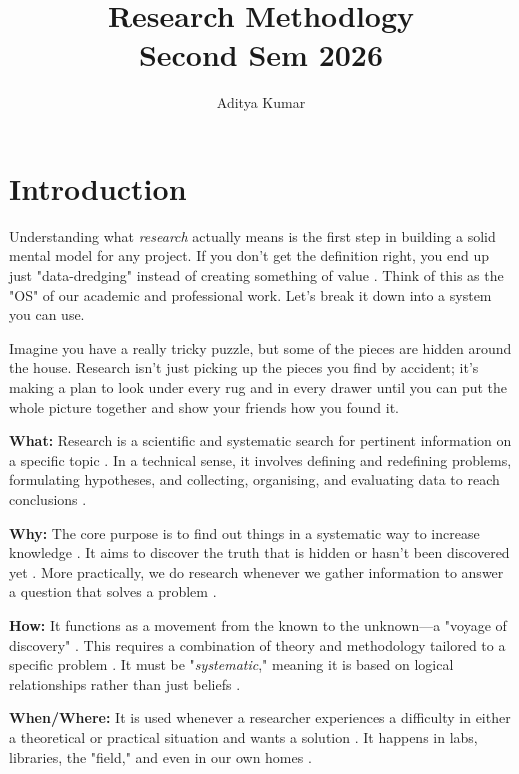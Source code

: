 \documentclass{report}
\title{\Huge{Research Methodlogy}\\[30pt]\large{Second Sem 2026}}
\author{Aditya Kumar}
\date{}
\begin{document}
\pagecolor{tnBg}
\color{tnFg}

\maketitle
\tableofcontents
\newpage

\chapter{Introduction}

Understanding what \textit{research} actually means is the first step in building a solid mental model for any project. If you don't get the definition right, you end up just "data-dredging" instead of creating something of value
.
Think of this as the "OS" of our academic and professional work. Let’s break it down into a system you can use.

\begin{layerELI5}
Imagine you have a really tricky puzzle, but some of the pieces are hidden around the house. Research isn't just picking up the pieces you find by accident; it’s making a plan to look under every rug and in every drawer until you can put the whole picture together and show your friends how you found it.
\end{layerELI5}


\begin{layerReal}
	\textbf{What:} Research is a scientific and systematic search for pertinent information on a specific topic
	. In a technical sense, it involves defining and redefining problems, formulating hypotheses, and collecting, organising, and evaluating data to reach conclusions
	.
	
	
	\textbf{Why:} The core purpose is to find out things in a systematic way to increase knowledge
	. It aims to discover the truth that is hidden or hasn't been discovered yet
	. More practically, we do research whenever we gather information to answer a question that solves a problem
	.
	
	
	\textbf{How:} It functions as a movement from the known to the unknown—a "voyage of discovery"
	. This requires a combination of theory and methodology tailored to a specific problem
	. It must be "\textit{systematic}," meaning it is based on logical relationships rather than just beliefs
	.
	
	
	\textbf{When/Where:} It is used whenever a researcher experiences a difficulty in either a theoretical or practical situation and wants a solution
	. It happens in labs, libraries, the "field," and even in our own homes
	.
\end{layerReal}
\end{document}
